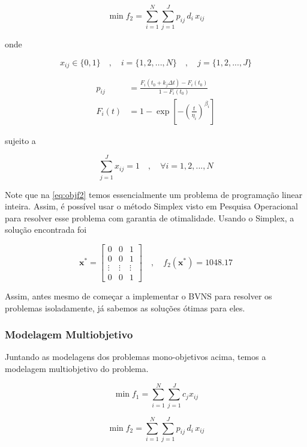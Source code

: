 \documentclass[conference]{IEEEtran}
\begin{document}
\begin{equation}\label{eq:objf2}
	\min f_2 = \sum_{i=1}^{N} \sum_{j=1}^{J} p_{ij} \, d_i \, x_{ij}
\end{equation}

\noindent onde 

\[ x_{ij} \in \{0,1\} \quad , \quad i = \{1, 2, ..., N\}  \quad , \quad j = \{1, 2, ..., J\} \]

\begin{align}
p_{ij} &= \frac{F_i \left(t_0 + k_j \Delta t \right) - F_i\left(t_0\right) }{1 - F_i\left(t_0\right)} \\
F_i(t) &= 1 - \exp \left[ - \left( \frac{t}{\eta_i} \right)^{\beta_i} \right]
\end{align}

\noindent sujeito a 

\begin{equation}\label{eq:restf2}
	\sum_{j=1}^{J} x_{ij} = 1 \quad , \quad \forall i = {1, 2, ..., N}
\end{equation}

Note que na \autoref{eq:objf2} temos essencialmente um problema de programação linear inteira.
Assim, é possível usar o método Simplex visto em Pesquisa Operacional para resolver esse problema
com garantia de otimalidade. Usando o Simplex, a solução encontrada foi 

\[ \mathbf{x^{*}}  = \begin{bmatrix} 
	0 & 0 & 1 \\
	0 & 0 & 1 \\
	\vdots & \vdots & \vdots \\
	0 &  0      & 1 
	\end{bmatrix} \quad , \quad f_2\left(\mathbf{x^{*}}\right) = 1048.17  \]

Assim, antes mesmo de começar a implementar o BVNS para resolver os problemas isoladamente, 
já sabemos as soluções ótimas para eles.

\subsubsection{Modelagem Multiobjetivo}

Juntando as modelagens dos problemas mono-objetivos acima, temos 
a modelagem multiobjetivo do problema.

\[  \min f_1 = \sum_{i=1}^{N} \sum_{j=1}^{J} c_j x_{ij} \]

\[  \min f_2 = \sum_{i=1}^{N} \sum_{j=1}^{J} p_{ij} \, d_i \, x_{ij} \]
\end{document}
